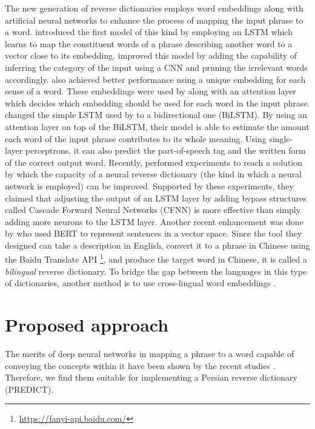 \documentclass{article}
\begin{document}
The new generation of reverse dictionaries employs word embeddings along with artificial neural networks to enhance the process of mapping the input phrase to a word. \citet{hill2016learning} introduced the first model of this kind by employing an LSTM \citep{hochreiter1997long} which learns to map the constituent words of a phrase describing another word to a vector close to its embedding. \citet{morinaga2018improvement} improved this model by adding the capability of inferring the category of the input using a CNN \citep{kim2014convolutional} and pruning the irrelevant words accordingly. \citet{pilehvar2019importance} also achieved better performance using a unique embedding for each sense of a word. These embeddings were used by \citet{hedderich2019using} along with an attention layer which decides which embedding should be used for each word in the input phrase. \citet{zheng2020multi} changed the simple LSTM used by \citet{hill2016learning} to a bidirectional one (BiLSTM). By using an attention layer on top of the BiLSTM, their model is able to estimate the amount each word of the input phrase contributes to its whole meaning. Using single-layer perceptrons, it can also predict the part-of-speech tag and the written form of the correct output word.
Recently, \citet{morinaga2020improvement} performed experiments to reach a solution by which the capacity of a neural reverse dictionary (the kind in which a neural network is employed) can be improved. Supported by these experiments, they claimed that adjusting the output of an LSTM layer by adding bypass structures called Cascade Forward Neural Networks (CFNN) is more effective than simply adding more neurons to the LSTM layer. Another recent enhancement was done by \citet{qi-etal-2020-wantwords} who used BERT \cite{devlin-etal-2019-bert} to represent sentences in a vector space. Since the tool they designed can take a description in English, convert it to a phrase in Chinese using the Baidu Translate API \footnote{\href{https://fanyi-api.baidu.com/}{https://fanyi-api.baidu.com/}}, and produce the target word in Chinese, it is called a \textit{bilingual} reverse dictionary. To bridge the gap between the languages in this type of dictionaries, another method is to use cross-lingual word embeddings \cite{chen-etal-2019-learning-represent}. 

\section{Proposed approach \label{sec:proposed-approach}}
The merits of deep neural networks in mapping a phrase to a word capable of conveying the concepts within it have been shown by the recent studies \citep{hill2016learning,kim2014convolutional,hedderich2019using,zheng2020multi}. Therefore, we find them suitable for implementing a Persian reverse dictionary (PREDICT).
\end{document}
